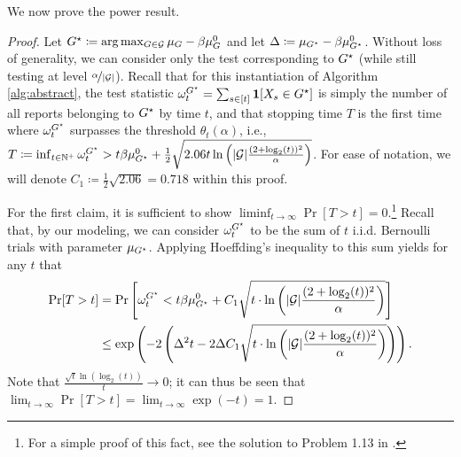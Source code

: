 We now prove the power result. 
\ztestpower*
\begin{proof}
Let ${G^\star} \coloneqq \arg\max_{G \in{\mathcal{G}}} \mu_G - \beta{\mu_G^0}$ and let $\Delta \coloneqq \mu_{{G^\star}} - \beta{\mu_{{G^\star}}^0}$. Without loss of generality, we can consider only the test corresponding to ${G^\star}$ (while still testing at level $\nicefrac{\alpha}{|{\mathcal{G}}|}$). 
Recall that for this instantiation of Algorithm \ref{alg:abstract}, the test statistic $\omega_t^{G^\star} = \sum_{s \in [t]} \mathbf{1}[X_s \in {G^\star}]$ is simply the number of all reports belonging to ${G^\star}$ by time $t$, and that stopping time $T$ is the first time where $\omega_t^{G^\star}$ surpasses the threshold $\theta_t(\alpha)$, i.e., $T \coloneqq \inf_{t \in {\mathbb{N}}^+} \omega_t^{G^\star} > t \beta{\mu_{{G^\star}}^0} + \tfrac12 \sqrt{2.06 t \ln \left(|{\mathcal{G}}| \frac{(2 + \log_2(t))^2}{\alpha}\right)}$. For ease of notation, we will denote $C_1 \coloneqq \tfrac12\sqrt{2.06} = 0.718$ within this proof. 

For the first claim, it is sufficient to show $\liminf_{t \to \infty} \Pr[T > t] = 0$.\footnote{For a simple proof of this fact, see the solution to Problem 1.13 in \citet{bertsekas2008introduction}.} 
Recall that, by our modeling, we can consider $\omega_t^{G^\star}$ to be the sum of $t$ i.i.d. Bernoulli trials with parameter $\mu_{G^\star}$.
Applying Hoeffding's inequality to this sum yields for any $t$ that
\begin{align*}
\Pr[T > t] &= 
\Pr\left[\omega_t^{G^\star} < t\beta{\mu_{{G^\star}}^0} + C_1 \sqrt{t \cdot \ln \left(|{\mathcal{G}}| \frac{(2 + \log_2(t))^2}{\alpha}\right)}\right]
\\&\leq \exp\left(-2\left(\Delta^2t - 2\Delta C_1 \sqrt{t \cdot \ln \left(|{\mathcal{G}}| \frac{(2 + \log_2(t))^2}{\alpha}\right)}\right) \right).
\end{align*}
Note that $\frac{\sqrt{t}\ln(\log_2(t))}{t} \to 0$; it can thus be seen that $\lim_{t \to\infty} \Pr[T > t] = \lim_{t \to \infty} \exp(-t) = 1$.


\end{proof}
